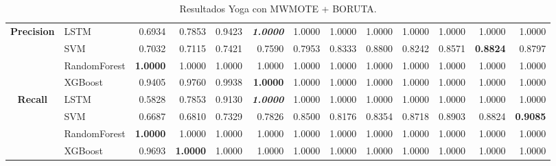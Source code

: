 \begin{table}[H]
\begin{adjustbox}{max width=12cm}
\begin{tabular}{|c|l|r|r|r|r|r|r|r|r|r|r|r|}
			\hline
			\textbf{Precision} &  LSTM &  0.6934 &  0.7853 &  0.9423 & \textit{ \textbf{  1.0000 } } &  1.0000 &  1.0000 &  1.0000 &  1.0000 &  1.0000 &  1.0000 &  1.0000 \\
			&  SVM &  0.7032 &  0.7115 &  0.7421 &  0.7590 &  0.7953 &  0.8333 &  0.8800 &  0.8242 &  0.8571 & \textbf{  0.8824 } &  0.8797 \\
			&  RandomForest & \textbf{  1.0000 } &  1.0000 &  1.0000 &  1.0000 &  1.0000 &  1.0000 &  1.0000 &  1.0000 &  1.0000 &  1.0000 &  1.0000 \\
			&  XGBoost &  0.9405 &  0.9760 &  0.9938 & \textbf{  1.0000 } &  1.0000 &  1.0000 &  1.0000 &  1.0000 &  1.0000 &  1.0000 &  1.0000 \\
			\hline
			\textbf{Recall} &  LSTM &  0.5828 &  0.7853 &  0.9130 & \textit{ \textbf{  1.0000 } } &  1.0000 &  1.0000 &  1.0000 &  1.0000 &  1.0000 &  1.0000 &  1.0000 \\
			&  SVM &  0.6687 &  0.6810 &  0.7329 &  0.7826 &  0.8500 &  0.8176 &  0.8354 &  0.8718 &  0.8903 &  0.8824 & \textbf{  0.9085 } \\
			&  RandomForest & \textbf{  1.0000 } &  1.0000 &  1.0000 &  1.0000 &  1.0000 &  1.0000 &  1.0000 &  1.0000 &  1.0000 &  1.0000 &  1.0000 \\
			&  XGBoost &  0.9693 & \textbf{  1.0000 } &  1.0000 &  1.0000 &  1.0000 &  1.0000 &  1.0000 &  1.0000 &  1.0000 &  1.0000 &  1.0000 \\
			\hline
		\end{tabular}
	\end{adjustbox}
	\caption{Resultados Yoga con MWMOTE + BORUTA.}
	\label{tab:Yoga_MWMOTE_BORUTA}
\end{table}


